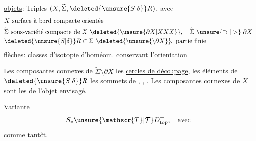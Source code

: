 \uline{objets}: Triples $(X,\widetilde{\Sigma},\deleted{\unsure{S|\delta}}R)$, avec
\[
\begin{aligned}
& X\ \text{surface à bord compacte orientée}\\
& \widetilde{\Sigma}\ \text{sous-variété compacte de }X\ \deleted{\unsure{\partial X|XXX}},\quad \widetilde{\Sigma}\mathrel{\unsure{\supset|>}}\partial X\\
& \deleted{\unsure{S|\delta}}R\subset\Sigma\ \deleted{\unsure{\setminus\partial X}},\ \text{partie finie}
\end{aligned}
\]
\uline{flèches}: classes d'isotopie d'homéom. conservant l'orientation

 Les composantes connexes de $\widetilde{\Sigma}\setminus\partial X$ \inserted{$=\Sigma$}  les \uline{cercles de découpage},  les éléments de $\deleted{\unsure{S|\delta}}R$  les  \uline{sommets de }, , . Les composantes connexes de $X$ sont les  de l'objet envisagé.

Variante
\[
S_{*}\unsure{\mathscr{T}|\mathcal{T}}D_{\mathrm{top}}^{\pm},\quad \text{avec}
\]
comme tantôt.

